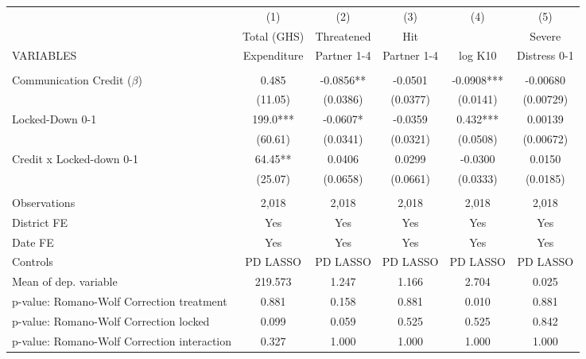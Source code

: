 \begin{tabular}{lccccc} \hline
 & (1) & (2) & (3) & (4) & (5) \\
 & Total (GHS) & Threatened & Hit &  & Severe \\
VARIABLES & Expenditure & Partner 1-4 & Partner 1-4 & log K10 & Distress 0-1 \\ \hline
 &  &  &  &  &  \\
Communication Credit ($\beta$) & 0.485 & -0.0856** & -0.0501 & -0.0908*** & -0.00680 \\
 & (11.05) & (0.0386) & (0.0377) & (0.0141) & (0.00729) \\
Locked-Down 0-1 & 199.0*** & -0.0607* & -0.0359 & 0.432*** & 0.00139 \\
 & (60.61) & (0.0341) & (0.0321) & (0.0508) & (0.00672) \\
Credit x Locked-down 0-1 & 64.45** & 0.0406 & 0.0299 & -0.0300 & 0.0150 \\
 & (25.07) & (0.0658) & (0.0661) & (0.0333) & (0.0185) \\
 &  &  &  &  &  \\
Observations & 2,018 & 2,018 & 2,018 & 2,018 & 2,018 \\
District FE & Yes & Yes & Yes & Yes & Yes \\
Date FE & Yes & Yes & Yes & Yes & Yes \\
Controls & PD LASSO & PD LASSO & PD LASSO & PD LASSO & PD LASSO \\
Mean of dep. variable & 219.573 & 1.247 & 1.166 & 2.704 & 0.025 \\
p-value: Romano-Wolf Correction treatment & 0.881 & 0.158 & 0.881 & 0.010 & 0.881 \\
p-value: Romano-Wolf Correction locked & 0.099 & 0.059 & 0.525 & 0.525 & 0.842 \\
 p-value: Romano-Wolf Correction interaction & 0.327 & 1.000 & 1.000 & 1.000 & 1.000 \\ \hline
\end{tabular}
